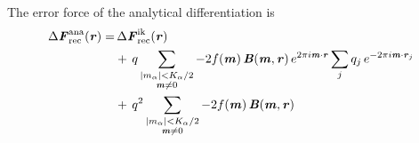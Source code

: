 \documentclass[aps,pre,preprint,unsortedaddress]{revtex4}
\renewcommand{\v}[1]{\textbf{\textit{#1}}}
\begin{document}
The error force of the analytical differentiation is 
\begin{align}\nonumber
  \Delta\v F_{\textrm{rec}}^{\textrm{ana}}(\v r)
  =&\,
  \Delta\v F_{\textrm{rec}}^{\textrm{ik}}(\v r)\\\nonumber
  & +\,
  q
  \sum_{
    \begin{subarray}{c}
      \vert m_{\alpha}\vert < K_\alpha/2\\
      \v m\neq 0
    \end{subarray}}
  -2f(\v m)\,
  \v B(\v m, \v r)\,e^{2\pi i\v m\cdot \v r}
  \sum_{j}q_j\,
  e^{-2\pi i\v m\cdot\v r_j} \\\label{eqn:ana.error.force}
  & +\,
  q^2
  \sum_{
    \begin{subarray}{c}
      \vert m_{\alpha}\vert < K_\alpha/2\\
      \v m\neq 0
    \end{subarray}}
  -2f(\v m)\,\v B(\v m, \v r) 
\end{align}
\end{document}
